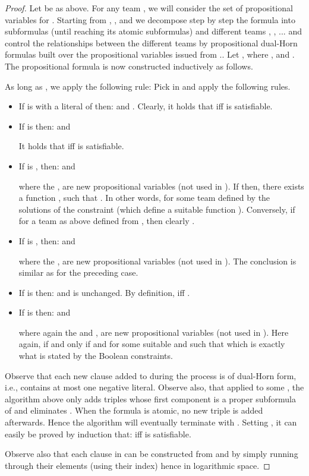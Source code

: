 \documentclass{article}
\theoremstyle{plain}
\theoremstyle{definition}
\begin{document}
  \begin{proof}
Let  be as above. For any team , we  will consider the set  of propositional variables  for .
Starting from , , and  we decompose step by step the formula  into subformulas (until reaching its atomic subformulas) and different teams , , ... and control the relationships between the different teams by propositional dual-Horn formulas built over the propositional variables issued from ..
Let , where , and . The propositional formula  is now constructed inductively as follows.
  
  As long as , we apply the following rule:  Pick  in  and apply the following rules.
  
  \begin{itemize}
  	\item If  is   with  a literal of  then:   and 
  	.
Clearly, it holds that  iff  is satisfiable.
  	
  	
  	\item If  is   then:   and  
  	
It holds that  iff  is satisfiable.
  	  	
  	
  	\item If  is  , then:  and 
  	
\noindent where the ,  are new  propositional variables (not used in ).
If  then, there exists a function , such that . In other words,   for some team  defined by the solutions  of the constraint  (which define a suitable function ). Conversely, if  for a team  as above defined from , then clearly .

  	
  	\item If  is   , then:  and 
  	  		


  	  	 \noindent where the ,  are new  propositional variables (not used in ). The conclusion is similar as for the preceding case.
  	  	 
  	\item  If  is    then: 
  	and  is unchanged. By definition,  iff .
  	 \item 	If  is    then:  and

\noindent where again the  and ,  are  new propositional variables  (not used in ). Here again,  if and only if  and  for some suitable  and  such that  which is exactly what is stated by the Boolean constraints.
  \end{itemize}
  
  Observe that each new clause added to  during the process is of dual-Horn form, i.e., contains at most one negative literal. Observe also, that applied to some , the algorithm above only adds triples   whose first component is a proper subformula of  and eliminates  . When the formula  is atomic, no new triple is added afterwards.  Hence the algorithm will eventually terminate with . 
 Setting , it can easily be proved by induction that:   iff   is satisfiable.  
 
  



Observe also that each clause in  can be constructed from  and  by simply running through their elements (using their index) hence  in logarithmic space. 
  \end{proof}
  
\end{document}
